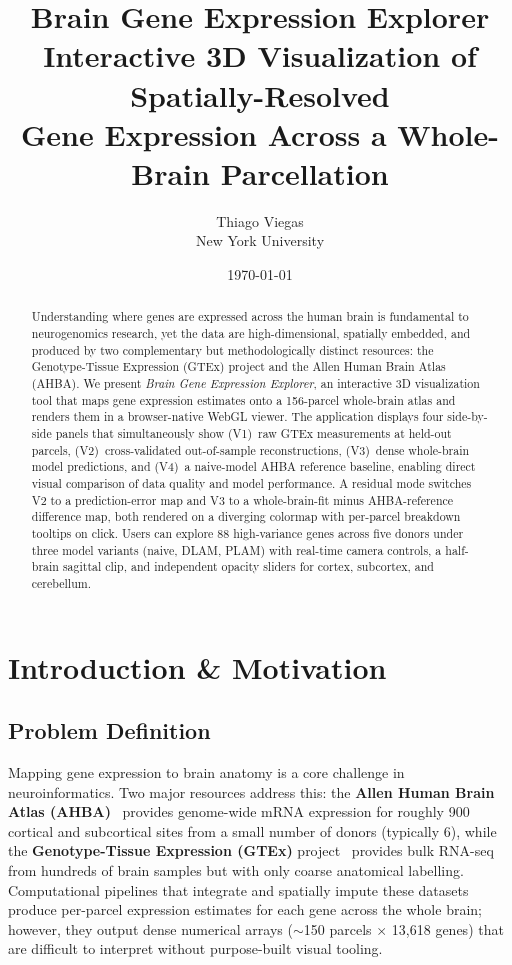\documentclass[11pt,letterpaper]{article}
\title{\textbf{Brain Gene Expression Explorer}\\
  \large Interactive 3D Visualization of Spatially-Resolved\\
  Gene Expression Across a Whole-Brain Parcellation}
\author{Thiago Viegas\\
  \small New York University}
\date{\today}
\begin{document}
\maketitle

\begin{abstract}
Understanding where genes are expressed across the human brain is fundamental to
neurogenomics research, yet the data are high-dimensional, spatially embedded, and
produced by two complementary but methodologically distinct resources: the
Genotype-Tissue Expression (GTEx) project and the Allen Human Brain Atlas (AHBA).
We present \emph{Brain Gene Expression Explorer}, an interactive 3D visualization
tool that maps gene expression estimates onto a 156-parcel whole-brain atlas and
renders them in a browser-native WebGL viewer.
The application displays four side-by-side panels that simultaneously show
(V1)~raw GTEx measurements at held-out parcels, (V2)~cross-validated
out-of-sample reconstructions, (V3)~dense whole-brain model predictions,
and (V4)~a naive-model AHBA reference baseline,
enabling direct visual comparison of data quality and model performance.
A residual mode switches V2 to a prediction-error map and V3 to a
whole-brain-fit minus AHBA-reference difference map, both rendered on
a diverging colormap with per-parcel breakdown tooltips on click.
Users can explore 88 high-variance genes across five donors under three
model variants (naive, DLAM, PLAM) with real-time camera controls,
a half-brain sagittal clip, and independent opacity sliders for cortex,
subcortex, and cerebellum.
\end{abstract}

\section{Introduction \& Motivation}
\label{sec:intro}

\subsection{Problem Definition}

Mapping gene expression to brain anatomy is a core challenge in neuroinformatics.
Two major resources address this:
the \textbf{Allen Human Brain Atlas (AHBA)}~\citep{hawrylycz2012} provides
genome-wide mRNA expression for roughly 900 cortical and subcortical sites
from a small number of donors (typically 6), while the
\textbf{Genotype-Tissue Expression (GTEx)} project~\citep{gtex2013}
provides bulk RNA-seq from hundreds of brain samples but with only coarse
anatomical labelling.
Computational pipelines that integrate and spatially impute these datasets produce
per-parcel expression estimates for each gene across the whole brain;
however, they output dense numerical arrays ($\sim$150 parcels $\times$ 13{,}618 genes)
that are difficult to interpret without purpose-built visual tooling.
\end{document}
